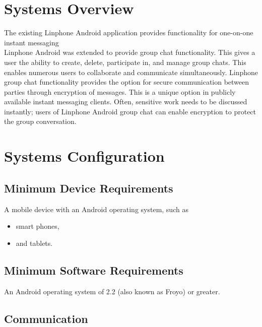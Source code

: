 \documentclass[11pt]{article}
\begin{document}


\setcounter{tocdepth}{3}
\setcounter{secnumdepth}{5}
\tableofcontents

\newpage
\section{Systems Overview}
The existing Linphone Android application provides functionality for one-on-one instant messaging \\
Linphone Android was extended to provide group chat functionality. This gives a user the ability to create, delete, participate in, and manage group chats. This enables numerous users to collaborate and communicate simultaneously. Linphone group chat functionality provides the option for secure communication between parties through encryption of messages. This is a unique option in publicly available instant messaging clients. Often, sensitive work needs to be discussed instantly; users of Linphone Android group chat can enable encryption to protect the group conversation.

\section{Systems Configuration}
\subsection{Minimum Device Requirements}
A mobile device with an Android operating system, such as
\begin{itemize}
\item smart phones,
\item and tablets.
\end{itemize}
\subsection{Minimum Software Requirements}
An Android operating system of 2.2 (also known as Froyo) or greater.

\subsection{Communication}
\end{document}
